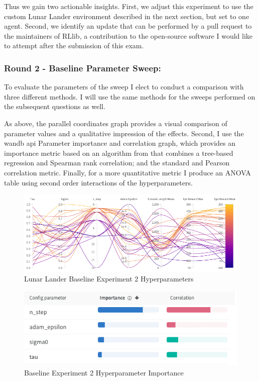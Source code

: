\documentclass[12pt,letterpaper]{exam}
\begin{document}
\begin{questions}
	Thus we gain two actionable insights. First, we adjust this experiment 
	to use the custom Lunar Lander environment described in the next section, 
	but set to one agent. Second, we identify an update that can be performed 
	by a pull request to the maintainers of RLlib, a contribution to the 
	open-source software I would like to attempt after the submission of this
	exam.
	
	\subsubsection*{Round 2 - Baseline Parameter Sweep:}
	To evaluate the parameters of the sweep I elect to  conduct a 
	comparison with three different methods. I will use the same methods 
	for the sweeps performed on the subsequent questions as well.
	
	As above, the parallel coordinates graph provides a visual comparison
	of parameter values and a qualitative impression of the effects.
	Second, I use the wandb api Parameter importance and correlation graph,
	which provides an importance metric based on an algorithm from
	\cite{howard2020deep} that combines a tree-based regression and 
	Spearman rank correlation; and the standard	and Pearson correlation
	metric. Finally, for a more quantitative metric I produce an ANOVA 
	table using second order interactions of the hyperparameters.
	
	\begin{figure}
		\centering
		\includegraphics[width=.95\linewidth]{para_coord_baseline_2.png}
		\caption{Lunar Lander Baseline Experiment 2 Hyperparameters}
		\label{fig:baseline_2_para}
	\end{figure}
	\begin{figure}
		\centering
		\includegraphics[width=.5\linewidth]{importance_baseline_2.png}
		\caption{Baseline Experiment 2 Hyperparameter Importance}
		\label{fig:baseline_2_importance}
	\end{figure}
	

\end{questions}
\end{document}
